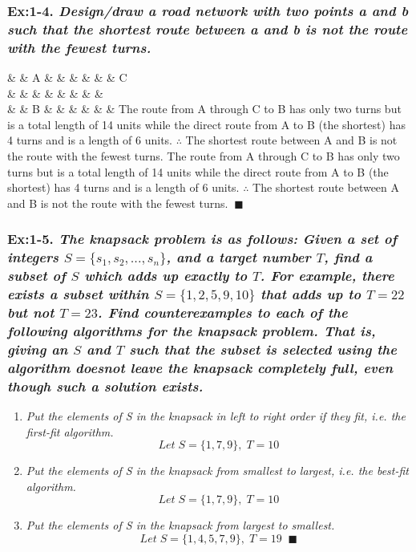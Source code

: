\subsubsection*{\textbf{\enspace Ex:1-4.} \emph{Design/draw a road network with two points a and b such that the shortest route between a and b is not the route with the fewest turns.}}
\begin{solcen}
	{\&  \arrow[d, "1"] \& A \arrow[rrrrrr, "6"] \arrow[l, "1"] \&  \&  \&  \&  \&  \& C \arrow[dd, "2"] \\
	\arrow[d, "1"] \&  \arrow[l, "1"] \&  \&  \&  \&  \&  \&  \&  \\
	\arrow[rr, "2"] \&  \& B \&  \&  \&  \&  \&  \&  \arrow[llllll, "6"]}
%
	{The route from A through C to B has only two turns but is a total length of 14 units while the direct route from A to B (the shortest) has 4 turns and is a length of 6 units. $\therefore$ The shortest route between A and B is not the route with the fewest turns. The route from A through C to B has only two turns but is a total length of 14 units while the direct route from A to B (the shortest) has 4 turns and is a length of 6 units. $\therefore$ The shortest route between A and B is not the route with the fewest turns.$\;\;\blacksquare$\\}
\end{solcen}


\subsubsection*{\textbf{\enspace Ex:1-5.} \emph{\textbf{The knapsack problem is as follows:}} \emph{Given a set of integers $S = \{s_{1}, s_{2},...,s_{n}\}$,
and a target number $T$, find a subset of $S$ which adds up exactly to $T$. For example, there exists a subset within $S = \{1, 2, 5, 9, 10\}$ that adds up to $T = 22$ but not $T = 23$. Find counterexamples to each of the following algorithms for the knapsack problem. That is, giving an $S$ and $T$ such that the subset is selected using the algorithm doesnot leave the knapsack completely full, even though such a solution exists.}}
\begin{enumerate}[label=(\alph*)]\itemsep1pt\parskip0pt
	\item{\emph{Put the elements of S in the knapsack in left to right order if they fit, i.e. the first-fit algorithm.} \\
		\textcolor{answer}{
		 $$Let\;  S = \{1,7,9\}, \; T = 10$$
		}
	}
	\item{\emph{Put the elements of S in the knapsack from smallest to largest, i.e. the best-fit algorithm.} \\
		\textcolor{answer}{
		$$Let\;  S = \{1,7,9\}, \; T = 10$$
		}
	}
	\item{\emph{Put the elements of S in the knapsack from largest to smallest.} \\
		\textcolor{answer}{
		$$Let\;  S = \{1,4,5,7,9\}, \; T = 19\;\;\blacksquare$$ 
		}
	}
\end{enumerate}


